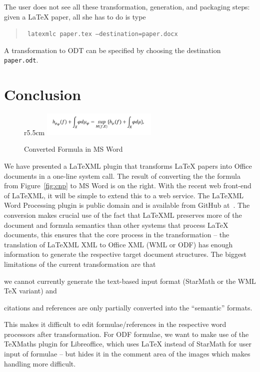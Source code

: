 \documentclass{llncs}
\def\latexml{{\LaTeX}ML\xspace}
\begin{document}
The user does not see all these transformation, generation, and packaging steps: given a
{\LaTeX} paper, all she has to do is type
\begin{quote}\tt
latexmlc paper.tex --destination=paper.docx
\end{quote}
A transformation to ODT can be specified by choosing the destination \texttt{paper.odt}.

\section{Conclusion}\label{sec:concl}
\begin{figure}r{5.5cm}\vspace*{-2.5em}
  \includegraphics[width=5.5cm]{convertedmathsnippet}\vspace*{-1.5em}
  \caption{Converted Formula in MS Word}\vspace*{-1.5em}
\end{figure}
We have presented a \latexml plugin that transforms {\LaTeX} papers into Office documents
in a one-line system call. The result of converting the the formula from
Figure~\ref{fig:cnp} to MS Word is on the right. With the recent web front-end of
\latexml, it will be simple to extend this to a web service. The \latexml Word Processing
plugin is public domain and is available from GitHub at~\cite{LaTeX2Office:github:on}. The
conversion makes crucial use of the fact that \latexml preserves more of the document and
formula semantics than other systems that process {\LaTeX} documents, this ensures that
the core process in the transformation -- the translation of \latexml XML to Office XML
(WML or ODF) has enough information to generate the respective target document
structures. The biggest limitations of the current transformation are that
\begin{inparaenum}[\em i\rm)]
\item we cannot currently generate the text-based input format (StarMath or the WML {\TeX}
  variant) and 
\item citations and references are only partially converted into the ``semantic'' formats.
\end{inparaenum}
This makes it difficult to edit formulae/references in the respective word processors
after transformation. For ODF formulae, we want to make use of the TeXMaths plugin for
Libreoffice, which uses {\LaTeX} instead of StarMath for user input of formulae -- but
hides it in the comment area of the images which makes handling more difficult.
\end{document}
